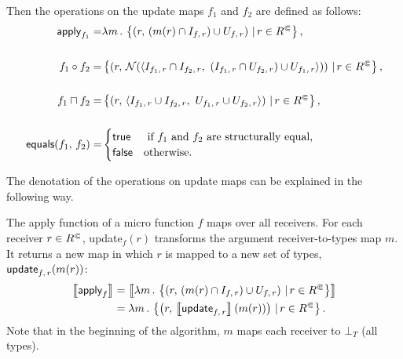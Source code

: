 Then the operations on the update maps $f_1$ and $f_2$ are defined as follows:
        \begin{align}
            \textsf{apply}_{f_1}=&\lambda m\,.\,
              \left\{
                \left(
                  r,\,
                  (m(r)\cap I_{f,\,r})\cup U_{f,\,r}
                \right)\,|\,
                r\in\rcc
              \right\},\\\notag \\
            f_1\circ f_2=&
            \left\{
              \left(
                r,\,
                  \mathcal N(\langle
                    I_{f_1,\,r}\cap I_{f_2,\,r},\ 
                    (I_{f_1,\,r}\cap U_{f_2,\,r})\cup U_{f_1,\,r}
                  \rangle)
              \right)\,|\,
              r\in\rcc
            \right\},\\\notag \\
            f_1\sqcap f_2=&
            \left\{
              \left(
                r,\,
                  \langle
                    I_{f_1,\,r}\cup I_{f_2,\,r},\ 
                    U_{f_1,\,r}\cup U_{f_2,\,r}
                  \rangle
              \right)\,|\,
              r\in\rcc
            \right\},\\\notag \\
            \textsf{equals}(f_1,\,f_2)=&
              \begin{cases}
                 \mathsf{true}&\text{ if }f_1\text{ and }f_2\text{ are structurally equal,}\\
                 \mathsf{false}&\text{otherwise.}
              \end{cases}
        \end{align}


The denotation of the operations on update maps can be explained in the following way.

The apply function of a micro function $f$ maps over all receivers. For each receiver $r\in {R^\Subset}$, \textsf{update}$_f(r)$ transforms the argument 
receiver-to-types map $m$. It returns a new map in which $r$ is mapped to a new set of types, $\textsf{update}_{f,\,r}(m(r))$:
\begin{align*}
    \left\llbracket\textsf{apply}_f\right\rrbracket
    &=\left\llbracket\lambda m\,.\,\left\{
                \left(
                  r,\,
                  (m(r)\cap I_{f,\,r})\cup U_{f,\,r}
                \right)\,|\,
                r\in{R^\Subset}
              \right\}\right\rrbracket\\
    &=\lambda m\,.\,\left\{\left(r,\,\left\llbracket\textsf{update}_{f,\,r}\right\rrbracket(m(r))\right)\,|\,r\in {R^\Subset}\right\}.
\end{align*}
Note that in the beginning of the algorithm, $m$ maps each receiver to $\bot_T$ (all types).

